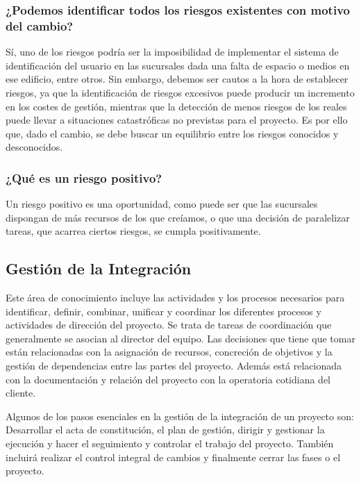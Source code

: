 \documentclass{article}
\begin{document}
\subsubsection{¿Podemos identificar todos los riesgos existentes con motivo del cambio?}

Sí, uno de los riesgos podría ser la imposibilidad de implementar el sistema de identificación del usuario en las sucursales dada una falta de espacio o medios en ese edificio, entre otros. Sin embargo, debemos ser cautos a la hora de establecer riesgos, ya que la identificación de riesgos excesivos puede producir un incremento en los costes de gestión, mientras que la detección de menos riesgos de los reales puede llevar a situaciones catastróficas no previstas para el proyecto. Es por ello que, dado el cambio, se debe buscar un equilibrio entre los riesgos conocidos y desconocidos.

\subsubsection{¿Qué es un riesgo positivo?}

Un riesgo positivo es una oportunidad, como puede ser que las sucursales dispongan de más recursos de los que creíamos, o que una decisión de paralelizar tareas, que acarrea ciertos riesgos, se cumpla positivamente.


\subsection{Gestión de la Integración}
Este área de conocimiento incluye las actividades y los procesos necesarios para identificar, definir, combinar, unificar y coordinar los diferentes procesos y actividades de dirección del proyecto. Se trata de tareas de coordinación que generalmente se asocian al director del equipo. Las decisiones que tiene que tomar están relacionadas con la asignación de recursos, concreción de objetivos y la gestión de dependencias entre las partes del proyecto. Además está relacionada con la documentación y relación del proyecto con la operatoria cotidiana del cliente.

Algunos de los pasos esenciales en la gestión de la integración de un proyecto son: Desarrollar el acta de constitución, el plan de gestión, dirigir y gestionar la ejecución y hacer el seguimiento y controlar el trabajo del proyecto. También incluirá realizar el control integral de cambios y finalmente cerrar las fases o el proyecto.
\end{document}
